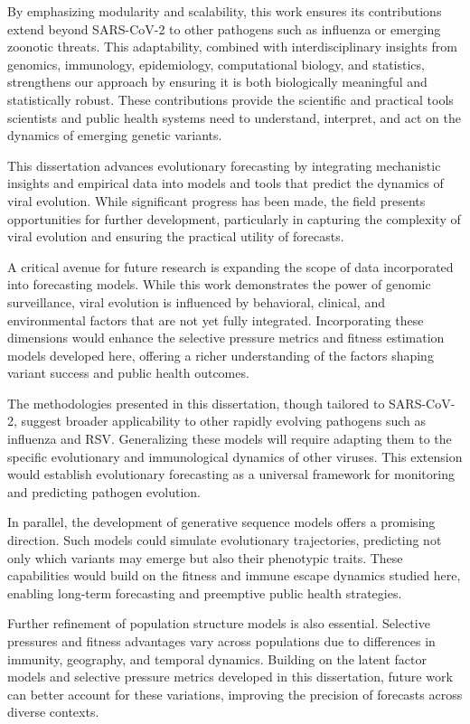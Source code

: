 By emphasizing modularity and scalability, this work ensures its contributions extend beyond SARS-CoV-2 to other pathogens such as influenza or emerging zoonotic threats.
This adaptability, combined with interdisciplinary insights from genomics, immunology, epidemiology, computational biology, and statistics, strengthens our approach by ensuring it is both biologically meaningful and statistically robust.
These contributions provide the scientific and practical tools scientists and public health systems need to understand, interpret, and act on the dynamics of emerging genetic variants.


This dissertation advances evolutionary forecasting by integrating mechanistic insights and empirical data into models and tools that predict the dynamics of viral evolution. While significant progress has been made, the field presents opportunities for further development, particularly in capturing the complexity of viral evolution and ensuring the practical utility of forecasts.

A critical avenue for future research is expanding the scope of data incorporated into forecasting models. While this work demonstrates the power of genomic surveillance, viral evolution is influenced by behavioral, clinical, and environmental factors that are not yet fully integrated.
Incorporating these dimensions would enhance the selective pressure metrics and fitness estimation models developed here, offering a richer understanding of the factors shaping variant success and public health outcomes.

The methodologies presented in this dissertation, though tailored to SARS-CoV-2, suggest broader applicability to other rapidly evolving pathogens such as influenza and RSV.
Generalizing these models will require adapting them to the specific evolutionary and immunological dynamics of other viruses.
This extension would establish evolutionary forecasting as a universal framework for monitoring and predicting pathogen evolution.

In parallel, the development of generative sequence models offers a promising direction.
Such models could simulate evolutionary trajectories, predicting not only which variants may emerge but also their phenotypic traits. These capabilities would build on the fitness and immune escape dynamics studied here, enabling long-term forecasting and preemptive public health strategies.

Further refinement of population structure models is also essential.
Selective pressures and fitness advantages vary across populations due to differences in immunity, geography, and temporal dynamics.
Building on the latent factor models and selective pressure metrics developed in this dissertation, future work can better account for these variations, improving the precision of forecasts across diverse contexts.

